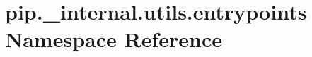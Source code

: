 \hypertarget{namespacepip_1_1__internal_1_1utils_1_1entrypoints}{}\section{pip.\+\_\+internal.\+utils.\+entrypoints Namespace Reference}
\label{namespacepip_1_1__internal_1_1utils_1_1entrypoints}
